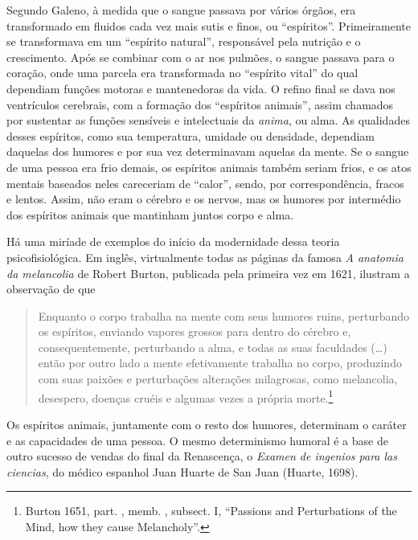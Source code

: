 Segundo Galeno, à medida que o sangue passava por vários órgãos, era
transformado em fluidos cada vez mais sutis e finos, ou ``espíritos''.
Primeiramente se transformava em um ``espírito natural'', responsável
pela nutrição e o crescimento. Após se combinar com o ar nos pulmões, o
sangue passava para o coração, onde uma parcela era transformada no
``espírito vital'' do qual dependiam funções motoras e mantenedoras da
vida. O refino final se dava nos ventrículos cerebrais, com a formação
dos ``espíritos animais'', assim chamados por sustentar as funções
sensíveis e intelectuais da \emph{anima}, ou alma. As qualidades desses
espíritos, como sua temperatura, umidade ou densidade, dependiam
daquelas dos humores e por sua vez determinavam aquelas da mente. Se o
sangue de uma pessoa era frio demais, os espíritos animais também seriam
frios, e os atos mentais baseados neles careceriam de ``calor'', sendo,
por correspondência, fracos e lentos. Assim, não eram o cérebro e os
nervos, mas os humores por intermédio dos espíritos animais que
mantinham juntos corpo e alma.

Há uma miríade de exemplos do início da modernidade dessa teoria
psicofisiológica. Em inglês, virtualmente todas as páginas da famosa
\emph{A anatomia da melancolia} de Robert Burton, publicada pela
primeira vez em 1621, ilustram a observação de que

\begin{quote}
Enquanto o corpo trabalha na mente com seus humores ruins, perturbando
os espíritos, enviando vapores grossos para dentro do cérebro e,
consequentemente, perturbando a alma, e todas as suas faculdades (\ldots{})
então por outro lado a mente efetivamente trabalha no corpo, produzindo
com suas paixões e perturbações alterações milagrosas, como melancolia,
desespero, doenças cruéis e algumas vezes a própria
morte.\footnote[7]{Burton 1651, part. , memb. , subsect. I, ``Passions and Perturbations of the Mind, how they cause Melancholy''.}
\end{quote}

Os espíritos animais, juntamente com o resto dos humores, determinam o
caráter e as capacidades de uma pessoa. O mesmo determinismo humoral é a
base de outro sucesso de vendas do final da Renascença, o \emph{Examen
de ingenios para las ciencias}, do médico espanhol Juan Huarte de San
Juan (Huarte, 1698).

